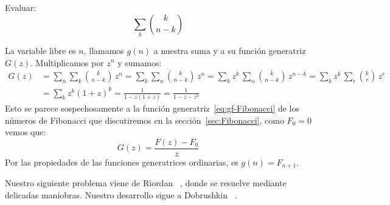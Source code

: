   \begin{example}
    Evaluar:
    \begin{equation*}
      \sum_k \binom{k}{n - k}
    \end{equation*}

    La variable libre es \(n\),
    llamamos \(g(n)\) a nuestra suma
    y a su función generatriz \(G(z)\).
    Multiplicamos por \(z^n\) y sumamos:
    \begin{align*}
      G(z)
	&= \sum_n \sum_k \binom{k}{n - k} \, z^n
	 = \sum_k \sum_n \binom{k}{n - k} \, z^n
	 = \sum_k z^k \, \sum_n \binom{k}{n - k} \, z^{n - k}
	 = \sum_k z^k \, \sum_r \binom{k}{r} \, z^r \\
	&= \sum_k z^k (1 + z)^k
	 = \frac{1}{1 - z (1 + z)}
	 = \frac{1}{1 - z - z^2}
    \end{align*}
    Esto se parece sospechosamente
    a la función generatriz~\eqref{eq:gf-Fibonacci}
    de los números de Fibonacci%
    que discutiremos en la sección~\ref{sec:Fibonacci},
    como \(F_0 = 0\) vemos que:
    \begin{equation*}
      G(z)
	= \frac{F(z) - F_0}{z}
    \end{equation*}
    Por las propiedades de las funciones generatrices ordinarias,
    es \(g(n) = F_{n + 1}\).
  \end{example}
  Nuestro siguiente problema viene de Riordan~%
    \cite{riordan68:_combin_ident},
  donde se resuelve mediante delicadas maniobras.
  Nuestro desarrollo sigue a Dobrushkin~%
    \cite{dobrushkin10:_method_algor_analysis}.
